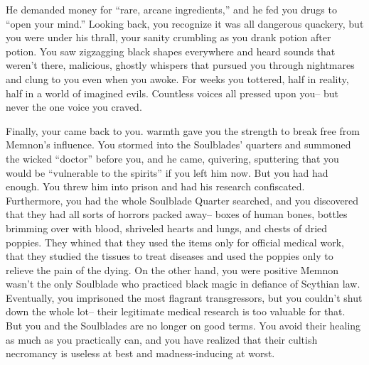 \documentclass[char]{Kos}
\begin{document}
He demanded money for ``rare, arcane ingredients,'' and he fed you drugs to ``open your mind.'' Looking back, you recognize it was all dangerous quackery, but you were under his thrall, your sanity crumbling as you drank potion after potion. You saw zigzagging black shapes everywhere and heard sounds that weren't there, malicious, ghostly whispers that pursued you through nightmares and clung to you even when you awoke. For weeks you tottered, half in reality, half in a world of imagined evils. Countless voices all pressed upon you-- but never the one voice you craved.

Finally, your \cScythiaKing{\spouse} came back to you. \cScythiaKing{\Their} warmth gave you the strength to break free from Memnon's influence. You stormed into the Soulblades' quarters and summoned the wicked ``doctor'' before you, and he came, quivering, sputtering that you would be ``vulnerable to the spirits'' if you left him now. But you had had enough. You threw him into prison and had his research confiscated. Furthermore, you had the whole Soulblade Quarter searched, and you discovered that they had all sorts of horrors packed away-- boxes of human bones, bottles brimming over with blood, shriveled hearts and lungs, and chests of dried poppies. They whined that they used the items only for official medical work, that they studied the tissues to treat diseases and used the poppies only to relieve the pain of the dying. On the other hand, you were positive Memnon wasn't the only Soulblade who practiced black magic in defiance of Scythian law. Eventually, you imprisoned the most flagrant transgressors, but you couldn't shut down the whole lot-- their legitimate medical research is too valuable for that. But you and the Soulblades are no longer on good terms. You avoid their healing as much as you practically can, and you have realized that their cultish necromancy is useless at best and madness-inducing at worst.
\end{document}
